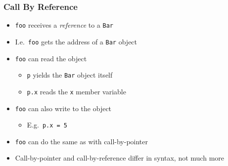 \begin{frame}
  \frametitle{Call By Reference}
  \begin{itemize}
    \item {\tt foo} receives a \emph{reference} to a {\tt Bar}
    \item I.e.~{\tt foo} gets the address of a {\tt Bar} object
    \item {\tt foo} can read the object
          \begin{itemize}
            \item {\tt p} yields the {\tt Bar} object itself
            \item {\tt p.x} reads the {\tt x} member variable
          \end{itemize}
    \item {\tt foo} can also write to the object
          \begin{itemize}
            \item E.g.~{\tt p.x = 5}
          \end{itemize}
    \item {\tt foo} can do the same as with call-by-pointer
    \item Call-by-pointer and call-by-reference differ in syntax, not much more
  \end{itemize}
\end{frame}

